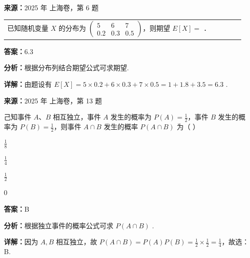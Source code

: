 \begin{question}[points=4]
\textbf{来源：}2025 年 上海卷，第 6 题\par
\begin{center}

\begin{tabular}{ccccc}

已知随机变量 $X$ 的分布为 $\begin{pmatrix} 5 & 6 & 7 \\ 0.2 & 0.3 & 0.5 \end{pmatrix}$，则期望 $E[X] =$ ．

\end{tabular}

\end{center}
\fillin[{$6.3$}]
\begin{solution}
\textbf{答案：}$6.3$

\textbf{分析：}根据分布列结合期望公式可求期望.

\textbf{详解：}由题设有 $E[X] = 5 \times 0.2 + 6 \times 0.3 + 7 \times 0.5 = 1 + 1.8 + 3.5 = 6.3$ .
\end{solution}
\end{question}

\begin{question}[points=4]
\textbf{来源：}2025 年 上海卷，第 13 题\par
己知事件 $A$、$B$ 相互独立，事件 $A$ 发生的概率为 $P(A) = \frac{1}{2}$，事件 $B$ 发生的概率为 $P(B) = \frac{1}{2}$，则事件 $A \cap B$ 发生的概率 $P(A \cap B)$ 为（ ）
\begin{choices}
  \item $\frac{1}{8}$
  \item $\frac{1}{4}$
  \item $\frac{1}{2}$
  \item $0$
\end{choices}
\begin{solution}
\textbf{答案：}B

\textbf{分析：}根据独立事件的概率公式可求 $P(A \cap B)$ .

\textbf{详解：}因为 $A, B$ 相互独立，故 $P(A \cap B) = P(A)P(B) = \frac{1}{2} \times \frac{1}{2} = \frac{1}{4}$，故选：B.
\end{solution}
\end{question}

